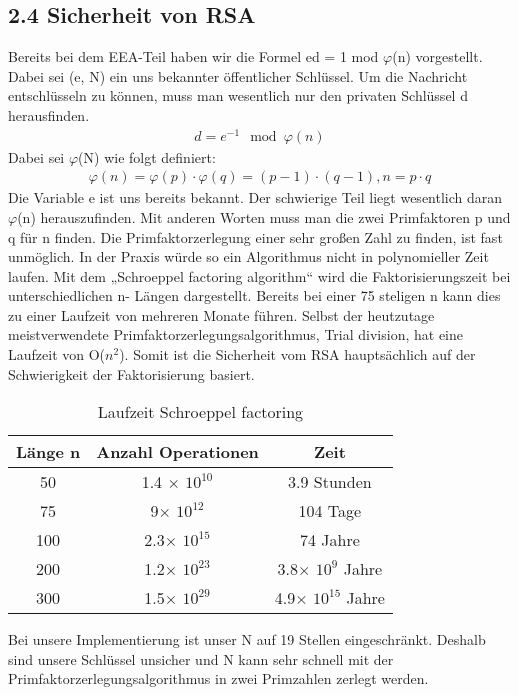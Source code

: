 \documentclass[course=asp]{aspdoc}
\begin{document}
\subsection*{2.4 Sicherheit von RSA}
Bereits bei dem EEA-Teil haben wir die Formel ed = 1 mod $\varphi $(n) vorgestellt.  Dabei sei (e, N) ein uns bekannter öffentlicher Schlüssel. Um die Nachricht entschlüsseln zu können, muss man wesentlich nur den privaten Schlüssel d herausfinden. 
\begin{align}
	d = e^{-1} \mod \varphi (n)
\end{align}
Dabei sei $\varphi $(N) wie folgt definiert:
\begin{align}
	\varphi (n) = \varphi (p)\cdot \varphi (q) = (p-1) \cdot (q-1), n = p \cdot q
\end{align}
Die Variable e ist uns bereits bekannt. Der schwierige Teil liegt wesentlich daran $\varphi $(n) herauszufinden. Mit anderen Worten muss man die zwei Primfaktoren p und q für n finden. Die Primfaktorzerlegung einer sehr großen Zahl zu finden, ist fast unmöglich. In der Praxis würde so ein Algorithmus nicht in polynomieller Zeit laufen. Mit dem „Schroeppel factoring algorithm“ wird die Faktorisierungszeit bei unterschiedlichen n- Längen dargestellt. Bereits bei einer 75 steligen n  kann dies zu einer Laufzeit von mehreren Monate führen. Selbst der heutzutage meistverwendete Primfaktorzerlegungsalgorithmus, Trial division, hat eine Laufzeit von O($n^{2}$). Somit ist die Sicherheit vom RSA hauptsächlich auf der Schwierigkeit der Faktorisierung basiert. \cite{AttacksOnRSA}

\begin{table}[H]
\centering
   \begin{tabular}{||c c c||} 
 \hline
 Länge n & Anzahl Operationen & Zeit  \\ [0.5ex] 
 \hline\hline
 50 & 1.4 $\times$ $10^{10}$  & 3.9 Stunden  \\ 
 \hline
 75 & 9$\times $ $10^{12}$  & 104 Tage  \\
 \hline
 100 & 2.3$\times $ $10^{15}$ & 74 Jahre  \\
 \hline
 200 & 1.2$\times $ $10^{23}$ & 3.8$\times $ $10^{9}$ Jahre\\
 \hline
 300 & 1.5$\times $ $10^{29}$ & 4.9$\times $ $10^{15}$ Jahre \\ [1ex] 
 \hline

\end{tabular}
    \caption{Laufzeit Schroeppel factoring}
\end{table}
Bei unsere Implementierung ist unser N auf 19 Stellen eingeschränkt. Deshalb sind unsere Schlüssel unsicher und N kann sehr schnell mit der Primfaktorzerlegungsalgorithmus in zwei Primzahlen zerlegt werden.
 
\end{document}
